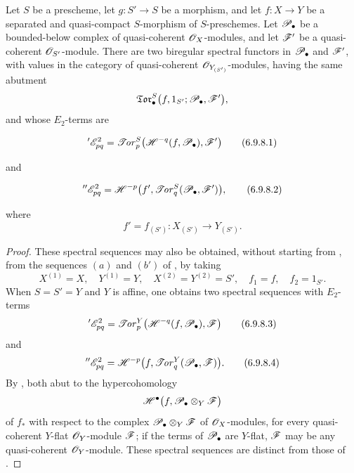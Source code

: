 \begin{proposition}[6.9.8]
\label{III.6.9.8}
Let $S$ be a prescheme, let $g:S'\to S$ be a morphism, and let
$f:X\to Y$ be a separated and quasi-compact $S$-morphism of
$S$-preschemes.  Let $\mathscr{P}_\bullet$ be a bounded-below complex of
quasi-coherent $\mathscr{O}_X$-modules, and let $\mathscr{F}'$ be a
quasi-coherent $\mathscr{O}_{S'}$-module.  There are two biregular
spectral functors in $\mathscr{P}_\bullet$ and $\mathscr{F}'$, with values in
the category of quasi-coherent $\mathscr{O}_{Y_{(S')}}$-modules, having
the same abutment
\[
  \mathfrak{Tor}_\bullet^S
  \bigl(
    f,1_{S'};\mathscr{P}_\bullet,\mathscr{F}'
  \bigr),
\]
and whose $E_2$-terms are
\begin{env}[6.9.8.1]
\label{III.6.9.8.1}
\[
  {}'\mathscr{E}_{pq}^2
  =
  \mathscr{T}\!\mathit{or}_p^S
  \bigl(
    \mathscr{H}^{-q}(f,\mathscr{P}_\bullet),\mathscr{F}'
  \bigr)
  \tag{6.9.8.1}\label{III.6.9.8.1.eq}
\]
\end{env}
and
\begin{env}[6.9.8.2]
\label{III.6.9.8.2}
\[
  {}''\mathscr{E}_{pq}^2
  =
  \mathscr{H}^{-p}
  \bigl(
    f',
    \mathscr{T}\!\mathit{or}_q^S(\mathscr{P}_\bullet,\mathscr{F}')
  \bigr),
  \tag{6.9.8.2}\label{III.6.9.8.2.eq}
\]
\end{env}
where
\[
  f'=f_{(S')}:
  X_{(S')}\longrightarrow Y_{(S')}.
\]
\end{proposition}

\begin{proof}
These spectral sequences may also be obtained, without starting
from , from the sequences $(a)$ and $(b')$ of
, by taking
\[
  X^{(1)}=X,\quad
  Y^{(1)}=Y,\quad
  X^{(2)}=Y^{(2)}=S',\quad
  f_1=f,\quad
  f_2=1_{S'}.
\]
When $S=S'=Y$ and $Y$ is affine, one obtains two spectral
sequences with $E_2$-terms
\[
  {}'\mathscr{E}_{pq}^2
  =
  \mathscr{T}\!\mathit{or}_p^Y
  \bigl(
    \mathscr{H}^{-q}(f,\mathscr{P}_\bullet),\mathscr{F}
  \bigr)
  \tag{6.9.8.3}\label{III.6.9.8.3}
\]
and
\[
  {}''\mathscr{E}_{pq}^2
  =
  \mathscr{H}^{-p}
  \bigl(
    f,\mathscr{T}\!\mathit{or}_q^Y(\mathscr{P}_\bullet,\mathscr{F})
  \bigr).
  \tag{6.9.8.4}\label{III.6.9.8.4}
\]
By , both abut to the hypercohomology
\[
  \mathscr{H}^\bullet
  \bigl(
    f,\mathscr{P}_\bullet\otimes_Y\mathscr{F}
  \bigr)
\]
of $f_*$ with respect to the complex
$\mathscr{P}_\bullet\otimes_Y\mathscr{F}$ of $\mathscr{O}_X$-modules, for every
quasi-coherent $Y$-flat $\mathscr{O}_Y$-module $\mathscr{F}$; if the terms of
$\mathscr{P}_\bullet$ are $Y$-flat, $\mathscr{F}$ may be any quasi-coherent
$\mathscr{O}_Y$-module.  These spectral sequences are distinct from
those of .
\end{proof}

